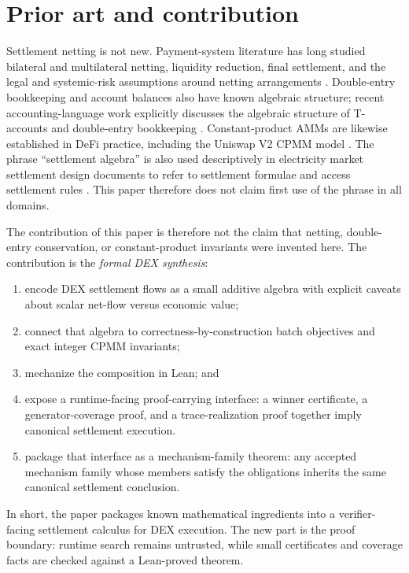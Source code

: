 \documentclass[11pt]{article}
\theoremstyle{remark}
\begin{document}
\section{Prior art and contribution}
\label{sec:prior-art}

Settlement netting is not new.  Payment-system literature has long studied
bilateral and multilateral netting, liquidity reduction, final settlement, and
the legal and systemic-risk assumptions around netting arrangements
\cite{bis1989netting}.  Double-entry bookkeeping and account balances also have
known algebraic structure; recent accounting-language work explicitly discusses
the algebraic structure of T-accounts and double-entry bookkeeping
\cite{botafogo2019syntax}.  Constant-product AMMs are likewise established in
DeFi practice, including the Uniswap V2 CPMM model \cite{uniswapv2}.
The phrase ``settlement algebra'' is also used descriptively in electricity
market settlement design documents to refer to settlement formulae and access
settlement rules \cite{aemo2014ofa}.  This paper therefore does not claim first
use of the phrase in all domains.

The contribution of this paper is therefore not the claim that netting,
double-entry conservation, or constant-product invariants were invented here.
The contribution is the \emph{formal DEX synthesis}:
\begin{enumerate}[leftmargin=2em]
  \item encode DEX settlement flows as a small additive algebra with explicit
        caveats about scalar net-flow versus economic value;
  \item connect that algebra to correctness-by-construction batch objectives
        and exact integer CPMM invariants;
  \item mechanize the composition in Lean; and
  \item expose a runtime-facing proof-carrying interface:
        a winner certificate, a generator-coverage proof, and a trace-realization
        proof together imply canonical settlement execution.
  \item package that interface as a mechanism-family theorem: any accepted
        mechanism family whose members satisfy the obligations inherits the same
        canonical settlement conclusion.
\end{enumerate}

In short, the paper packages known mathematical ingredients into a verifier-facing
settlement calculus for DEX execution.  The new part is the proof boundary:
runtime search remains untrusted, while small certificates and coverage facts
are checked against a Lean-proved theorem.
\end{document}
